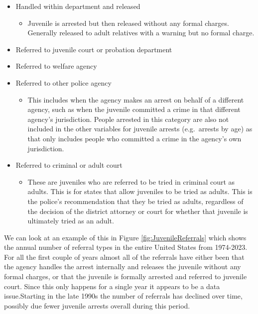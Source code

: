 \documentclass[
]{krantz}
\providecommand{\tightlist}{%
  \setlength{\itemsep}{0pt}\setlength{\parskip}{0pt}}
\begin{document}
\begin{itemize}
\tightlist
\item
  Handled within department and released

  \begin{itemize}
  \tightlist
  \item
    Juvenile is arrested but then released without any
    formal charges. Generally released to adult relatives
    with a warning but no formal charge.
  \end{itemize}
\item
  Referred to juvenile court or probation department
\item
  Referred to welfare agency
\item
  Referred to other police agency

  \begin{itemize}
  \tightlist
  \item
    This includes when the agency makes an arrest on behalf
    of a different agency, such as when the juvenile
    committed a crime in that different agency's
    jurisdiction. People arrested in this category are also
    not included in the other variables for juvenile arrests
    (e.g.~arrests by age) as that only includes people who
    committed a crime in the agency's own jurisdiction.
  \end{itemize}
\item
  Referred to criminal or adult court

  \begin{itemize}
  \tightlist
  \item
    These are juveniles who are referred to be tried in
    criminal court as adults. This is for states that allow
    juveniles to be tried as adults. This is the police's
    recommendation that they be tried as adults, regardless
    of the decision of the district attorney or court for
    whether that juvenile is ultimately tried as an adult.
  \end{itemize}
\end{itemize}

We can look at an example of this in Figure
\ref{fig:JuvenileReferrals} which shows the annual number of
referral types in the entire United States from 1974-2023.
For all the first couple of years almost all of the
referrals have either been that the agency handles the
arrest internally and releases the juvenile without any
formal charges, or that the juvenile is formally arrested
and referred to juvenile court. Since this only happens for
a single year it appears to be a data issue.Starting in the
late 1990s the number of referrals has declined over time,
possibly due fewer juvenile arrests overall during this
period.
\end{document}
